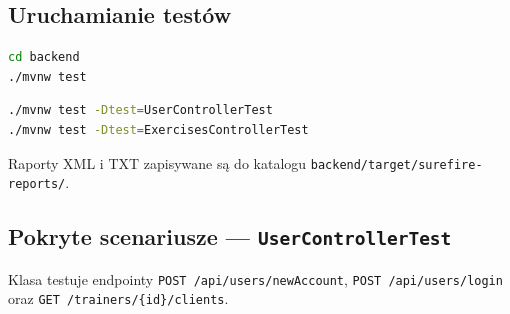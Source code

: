 \documentclass[12pt,a4paper]{article}
\begin{document}
\subsection{Uruchamianie testów}

\begin{lstlisting}[language=bash, caption={Uruchomienie wszystkich testów jednostkowych}]
cd backend
./mvnw test
\end{lstlisting}

\begin{lstlisting}[language=bash, caption={Uruchomienie testów wybranego kontrolera}]
./mvnw test -Dtest=UserControllerTest
./mvnw test -Dtest=ExercisesControllerTest
\end{lstlisting}

Raporty XML i TXT zapisywane są do katalogu \texttt{backend/target/surefire-reports/}.

\subsection{Pokryte scenariusze --- \texttt{UserControllerTest}}

Klasa testuje endpointy \texttt{POST /api/users/newAccount},
\texttt{POST /api/users/login} oraz \texttt{GET /trainers/\{id\}/clients}.
\end{document}
